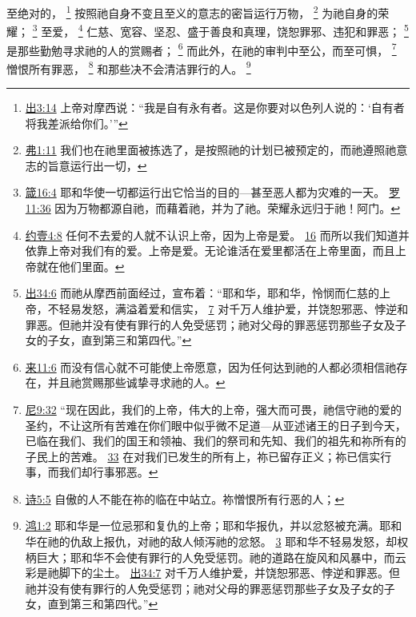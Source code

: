 \documentclass[12pt, a4paper, oneside]{ctexart}
\begin{document}
	至绝对的，
	\footnote {
		\href{https://biblehub.com/exodus/3-14.htm}{出3:14} 上帝对摩西说：“我是自有永有者。这是你要对以色列人说的：‘自有者将我差派给你们。’”
	}
	按照祂自身不变且至义的意志的密旨运行万物，
	\footnote {
		\href{https://biblehub.com/ephesians/1-11.htm}{弗1:11} 我们也在祂里面被拣选了，是按照祂的计划已被预定的，而祂遵照祂意志的旨意运行出一切，
	}
	为祂自身的荣耀；
	\footnote {
		\href{https://biblehub.com/proverbs/16-4.htm}{箴16:4} 耶和华使一切都运行出它恰当的目的---甚至恶人都为灾难的一天。
		\href{https://biblehub.com/romans/11-36.htm}{罗11:36} 因为万物都源自祂，而藉着祂，并为了祂。荣耀永远归于祂！阿门。
	}
	至爱，
	\footnote {
		\href{https://biblehub.com/1_john/4-8.htm}{约壹4:8} 任何不去爱的人就不认识上帝，因为上帝是爱。
		\href{https://biblehub.com/1_john/4-16.htm}{16} 而所以我们知道并依靠上帝对我们有的爱。上帝是爱。无论谁活在爱里都活在上帝里面，而且上帝就在他们里面。
	}
	仁慈、宽容、坚忍、盛于善良和真理，饶恕罪邪、违犯和罪恶；
	\footnote {
		\href{https://biblehub.com/exodus/34-6.htm}{出34:6} 而祂从摩西前面经过，宣布着：“耶和华，耶和华，怜悯而仁慈的上帝，不轻易发怒，满溢着爱和信实，
		\href{https://biblehub.com/exodus/34-7.htm}{7} 对千万人维护爱，并饶恕邪恶、悖逆和罪恶。但祂并没有使有罪行的人免受惩罚；祂对父母的罪恶惩罚那些子女及子女的子女，直到第三和第四代。”
	}
	是那些勤勉寻求祂的人的赏赐者；
	\footnote {
		\href{https://biblehub.com/hebrews/11-6.htm}{来11:6} 而没有信心就不可能使上帝愿意，因为任何达到祂的人都必须相信祂存在，并且祂赏赐那些诚挚寻求祂的人。
	}
	而此外，在祂的审判中至公，而至可惧，
	\footnote {
		\href{https://biblehub.com/nehemiah/9-32.htm}{尼9:32} “现在因此，我们的上帝，伟大的上帝，强大而可畏，祂信守祂的爱的圣约，不让这所有苦难在你们眼中似乎微不足道---从亚述诸王的日子到今天，已临在我们、我们的国王和领袖、我们的祭司和先知、我们的祖先和祢所有的子民上的苦难。
		\href{https://biblehub.com/nehemiah/9-33.htm}{33} 在对我们已发生的所有上，祢已留存正义；祢已信实行事，而我们却行事邪恶。
	}
	憎恨所有罪恶，
	\footnote {
		\href{https://biblehub.com/psalms/5-5.htm}{诗5:5} 自傲的人不能在祢的临在中站立。祢憎恨所有行恶的人；
	}
	和那些决不会清洁罪行的人。
	\footnote {
		\href{https://biblehub.com/nahum/1-2.htm}{鸿1:2} 耶和华是一位忌邪和复仇的上帝；耶和华报仇，并以忿怒被充满。耶和华在祂的仇敌上报仇，对祂的敌人倾泻祂的忿怒。
		\href{https://biblehub.com/nahum/1-3.htm}{3} 耶和华不轻易发怒，却权柄巨大；耶和华不会使有罪行的人免受惩罚。祂的道路在旋风和风暴中，而云彩是祂脚下的尘土。
		\href{https://biblehub.com/exodus/34-7.htm}{出34:7} 对千万人维护爱，并饶恕邪恶、悖逆和罪恶。但祂并没有使有罪行的人免受惩罚；祂对父母的罪恶惩罚那些子女及子女的子女，直到第三和第四代。”
	}
\end{document}
